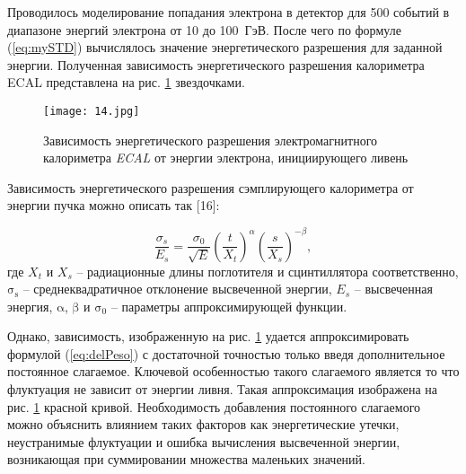 Проводилось моделирование попадания электрона в детектор для 500 событий в диапазоне энергий электрона от 10 до \mbox{100 ГэВ}. После чего по формуле (\ref{eq:mySTD}) вычислялось значение энергетического разрешения для заданной энергии. Полученная зависимость энергетического разрешения калориметра ECAL представлена на рис. \ref{fig:enResFit} звездочками.

\begin{figure}[H]
    \centering
    \texttt{[image: 14.jpg]}
    \caption{Зависимость энергетического разрешения электромагнитного калориметра \textit{ECAL} от энергии электрона, инициирующего ливень}
    \label{fig:enResFit}
\end{figure}

Зависимость энергетического разрешения сэмплирующего калориметра от энергии пучка можно описать так [16]:

\begin{equation}\label{eq:delPeso}
\frac{\sigma_s}{E_s} = \frac{\sigma_0}{\sqrt{E}}
\left(
\frac{t}{X_t}
\right)
^{\alpha}
\left(
\frac{s}{X_s}
\right)
^{-\beta},
\end{equation}
где $X_t$ и $X_s$ -- радиационные длины поглотителя и сцинтиллятора соответственно, $\mathrm{\sigma_s}$ -- среднеквадратичное отклонение высвеченной энергии, $E_s$ -- высвеченная энергия, $\mathrm{\alpha}$, $\mathrm{\beta}$ и $\mathrm{\sigma_0}$ -- параметры аппроксимирующей функции. 
 
Однако, зависимость, изображенную на рис. \ref{fig:enResFit} удается аппроксимировать формулой (\ref{eq:delPeso}) с достаточной точностью только введя дополнительное постоянное слагаемое. Ключевой особенностью такого слагаемого является то что флуктуация не зависит от энергии ливня. Такая аппроксимация изображена на рис. \ref{fig:enResFit} красной кривой. Необходимость добавления постоянного слагаемого можно объяснить влиянием таких факторов как энергетические утечки, неустранимые флуктуации и ошибка вычисления высвеченной энергии, возникающая при суммировании множества маленьких значений.

